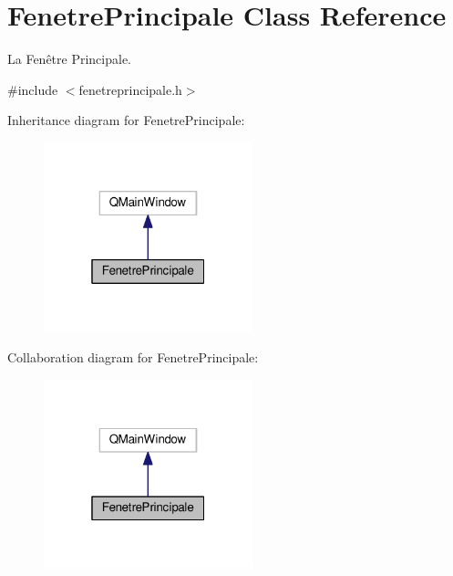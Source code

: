 \hypertarget{classFenetrePrincipale}{}\section{Fenetre\+Principale Class Reference}
\label{classFenetrePrincipale}


La Fenêtre Principale.  




{\ttfamily \#include $<$fenetreprincipale.\+h$>$}



Inheritance diagram for Fenetre\+Principale\+:\nopagebreak
\begin{figure}[H]
\begin{center}
\leavevmode
\includegraphics[width=172pt]{classFenetrePrincipale__inherit__graph}
\end{center}
\end{figure}


Collaboration diagram for Fenetre\+Principale\+:\nopagebreak
\begin{figure}[H]
\begin{center}
\leavevmode
\includegraphics[width=172pt]{classFenetrePrincipale__coll__graph}
\end{center}
\end{figure}
